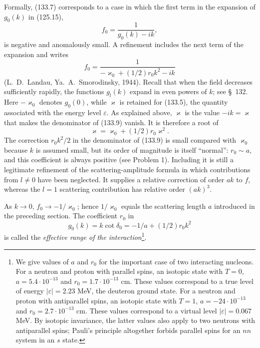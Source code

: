 Formally, (133.7) corresponds to a case in which the first term in the expansion of $g_0(k)$ in (125.15),
\[
 f_0=\frac1{g_0(k)-ik},
\]
is negative and anomalously small. A refinement includes the next term of the expansion and writes
\begin{equation}
 f_0=\frac1{-\varkappa_0+(1/2)r_0k^2-ik}
 \tag{133.9}
\end{equation}
(L.~D.~Landau, Ya.~A.~Smorodinsky, 1944). Recall that when the field decreases sufficiently rapidly, the functions $g_l(k)$ expand in even powers of $k$; see \S~132. Here $-\varkappa_0$ denotes $g_0(0)$, while $\varkappa$ is retained for (133.5), the quantity associated with the energy level $\varepsilon$. As explained above, $\varkappa$ is the value $-ik=\varkappa$ that makes the denominator of (133.9) vanish. It is therefore a root of
\begin{equation}
 \varkappa=\varkappa_0+(1/2)r_0\varkappa^2.
 \tag{133.10}
\end{equation}
The correction $r_0k^2/2$ in the denominator of (133.9) is small compared with $\varkappa_0$ because $k$ is assumed small, but its order of magnitude is itself ``normal'': $r_0\sim a$, and this coefficient is always positive (see Problem 1). Including it is still a legitimate refinement of the scattering-amplitude formula in which contributions from $l\ne0$ have been neglected. It supplies a relative correction of order $ak$ to $f$, whereas the $l=1$ scattering contribution has relative order $(ak)^3$.

As $k\to0$, $f_0\to-1/\varkappa_0$; hence $1/\varkappa_0$ equals the scattering length $a$ introduced in the preceding section. The coefficient $r_0$ in
\begin{equation}
 g_0(k)=k\cot\delta_0=-1/a+(1/2)r_0k^2
 \tag{133.11}
\end{equation}
is called the \emph{effective range of the interaction}\footnote{We give values of $a$ and $r_0$ for the important case of two interacting nucleons. For a neutron and proton with parallel spins, an isotopic state with $T=0$, $a=5{.}4\cdot10^{-13}$ and $r_0=1{.}7\cdot10^{-13}$ cm. These values correspond to a true level of energy $|\varepsilon|=2{.}23$ MeV, the deuteron ground state. For a neutron and proton with antiparallel spins, an isotopic state with $T=1$, $a=-24\cdot10^{-13}$ and $r_0=2{.}7\cdot10^{-13}$ cm. These values correspond to a virtual level $|\varepsilon|=0{.}067$ MeV. By isotopic invariance, the latter values also apply to two neutrons with antiparallel spins; Pauli's principle altogether forbids parallel spins for an $nn$ system in an $s$ state.}.

